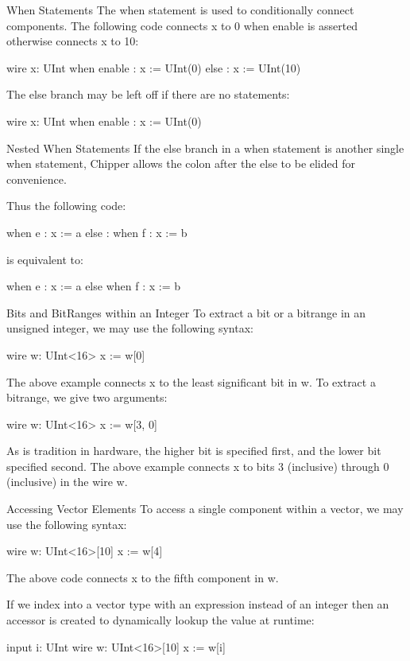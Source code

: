 \documentclass[xcolor=pdflatex,dvipsnames,table]{beamer}
\begin{document}
\begin{frame}[fragile]{When Statements}
The when statement is used to conditionally connect components. The following code connects x to 0 when enable is asserted otherwise connects x to 10:
\begin{stanza}
wire x: UInt
when enable :
   x := UInt(0)
else :
   x := UInt(10)
\end{stanza}
The else branch may be left off if there are no statements:
\begin{stanza}
wire x: UInt
when enable :
   x := UInt(0)
\end{stanza}
\end{frame}

\begin{frame}[fragile]{Nested When Statements}
If the else branch in a when statement is another single when statement, Chipper allows the colon after the else to be elided for convenience.
  
Thus the following code:
\begin{stanza}
when e :
   x := a
else :
   when f :
      x := b
\end{stanza}
\noindent
is equivalent to:
\begin{stanza}
when e :
   x := a
else when f :
   x := b
\end{stanza}
\end{frame}

\begin{frame}[fragile]{Bits and BitRanges within an Integer}
To extract a bit or a bitrange in an unsigned integer, we may use the following syntax:
\begin{stanza}
wire w: UInt<16>
x := w[0]
\end{stanza}
\noindent
The above example connects x to the least significant bit in w. To extract a bitrange, we give two arguments:
\begin{stanza}
wire w: UInt<16>
x := w[3, 0]
\end{stanza}
As is tradition in hardware, the higher bit is specified first, and the lower bit specified second. The above example connects x to bits 3 (inclusive) through 0 (inclusive) in the wire w.
\end{frame}

\begin{frame}[fragile]{Accessing Vector Elements}
To access a single component within a vector, we may use the following syntax:
\begin{stanza}
wire w: UInt<16>[10]
x := w[4]
\end{stanza}
\noindent
The above code connects x to the fifth component in w.

If we index into a vector type with an expression instead of an integer then an accessor is created to dynamically lookup the value at runtime:
\begin{stanza}
input i: UInt
wire w: UInt<16>[10]
x := w[i]
\end{stanza}
\end{frame}
\end{document}
